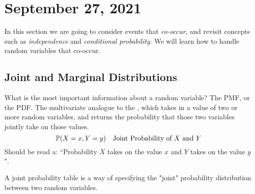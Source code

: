 \section{September 27, 2021}
In this section we are going to consider events that \textit{co-occur}, and revisit concepts such as \textit{independence} and \textit{conditional probability}. We will learn how to handle random variables that co-occur.
\subsection{Joint and Marginal Distributions}
What is the most important information about a random variable? The PMF, or the PDF. The multivariate analogue to the , which takes in a value of two or more random variables, and returns the probability that those two variables jointly take on those values.
$$
\mathbb P(X =x, Y=y) \quad \text{Joint Probability of $X$ and $Y$}
$$
Should be read a: ``Probability $X$ takes on the value $x$ and $Y$ takes on the value $y$".
\begin{definition}
 A joint probability table is a way of specifying the "joint" probability distribution between two random variables.    
\end{definition}